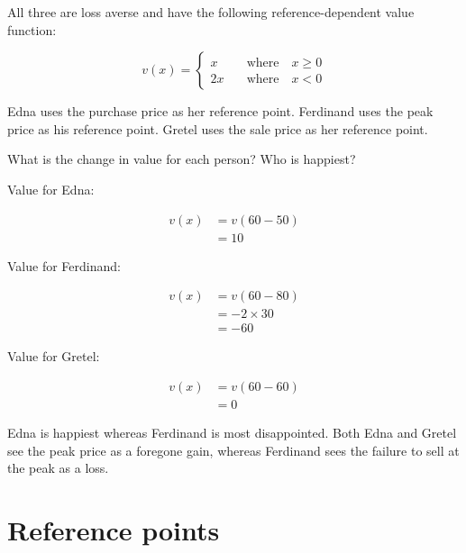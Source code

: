 \documentclass[
  letterpaper,
  DIV=11,
  numbers=noendperiod]{scrreprt}
\begin{document}
All three are loss averse and have the following reference-dependent
value function:

\[
v(x)=\left\{\begin{matrix}
x \quad &\textrm{where} \quad x \geq 0\\
2x \quad &\textrm{where} \quad x < 0
\end{matrix}\right.
\]

Edna uses the purchase price as her reference point. Ferdinand uses the
peak price as his reference point. Gretel uses the sale price as her
reference point.

What is the change in value for each person? Who is happiest?

\begin{tcolorbox}[enhanced jigsaw, title=\textcolor{quarto-callout-tip-color}{\faLightbulb}\hspace{0.5em}{Answer}, toprule=.15mm, colback=white, breakable, titlerule=0mm, colframe=quarto-callout-tip-color-frame, coltitle=black, opacityback=0, rightrule=.15mm, colbacktitle=quarto-callout-tip-color!10!white, bottomtitle=1mm, opacitybacktitle=0.6, arc=.35mm, bottomrule=.15mm, toptitle=1mm, leftrule=.75mm, left=2mm]

Value for Edna:

\begin{align*}
v(x)&=v(60-50) \\
&=10
\end{align*}

Value for Ferdinand:

\begin{align*}
v(x)&=v(60-80) \\
&=-2\times 30 \\
&=-60
\end{align*}

Value for Gretel:

\begin{align*}
v(x)&=v(60-60) \\
&=0
\end{align*}

Edna is happiest whereas Ferdinand is most disappointed. Both Edna and
Gretel see the peak price as a foregone gain, whereas Ferdinand sees the
failure to sell at the peak as a loss.

\end{tcolorbox}

\hypertarget{reference-points-1}{%
\section{Reference points}\label{reference-points-1}}
\end{document}

